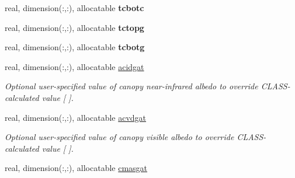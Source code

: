 \begin{DoxyCompactItemize}
\item 
\hypertarget{structclass__statevars_1_1class__gather_af4f52670a67b8806cca8561c90ac7df2}{}real, dimension(\+:,\+:), allocatable {\bfseries tcbotc}\label{structclass__statevars_1_1class__gather_af4f52670a67b8806cca8561c90ac7df2}

\item 
\hypertarget{structclass__statevars_1_1class__gather_a1bdc1eee1f41a250b890d99386102511}{}real, dimension(\+:,\+:), allocatable {\bfseries tctopg}\label{structclass__statevars_1_1class__gather_a1bdc1eee1f41a250b890d99386102511}

\item 
\hypertarget{structclass__statevars_1_1class__gather_a4ec45a970709f2f04dc9010912657464}{}real, dimension(\+:,\+:), allocatable {\bfseries tcbotg}\label{structclass__statevars_1_1class__gather_a4ec45a970709f2f04dc9010912657464}

\item 
\hypertarget{structclass__statevars_1_1class__gather_abaed10e79cc08627ee52b26c74305720}{}real, dimension(\+:,\+:), allocatable \hyperlink{structclass__statevars_1_1class__gather_abaed10e79cc08627ee52b26c74305720}{acidgat}\label{structclass__statevars_1_1class__gather_abaed10e79cc08627ee52b26c74305720}

\begin{DoxyCompactList}\small\item\em Optional user-\/specified value of canopy near-\/infrared albedo to override C\+L\+A\+S\+S-\/calculated value \mbox{[} \mbox{]}. \end{DoxyCompactList}\item 
\hypertarget{structclass__statevars_1_1class__gather_aa3cc6089e9f0e4b0bbc32c1d23dbd05a}{}real, dimension(\+:,\+:), allocatable \hyperlink{structclass__statevars_1_1class__gather_aa3cc6089e9f0e4b0bbc32c1d23dbd05a}{acvdgat}\label{structclass__statevars_1_1class__gather_aa3cc6089e9f0e4b0bbc32c1d23dbd05a}

\begin{DoxyCompactList}\small\item\em Optional user-\/specified value of canopy visible albedo to override C\+L\+A\+S\+S-\/calculated value \mbox{[} \mbox{]}. \end{DoxyCompactList}\item 
\hypertarget{structclass__statevars_1_1class__gather_ac730b9230a698bf79b0aee4f2dc5f389}{}real, dimension(\+:,\+:), allocatable \hyperlink{structclass__statevars_1_1class__gather_ac730b9230a698bf79b0aee4f2dc5f389}{cmasgat}\label{structclass__statevars_1_1class__gather_ac730b9230a698bf79b0aee4f2dc5f389}


\end{DoxyCompactItemize}
